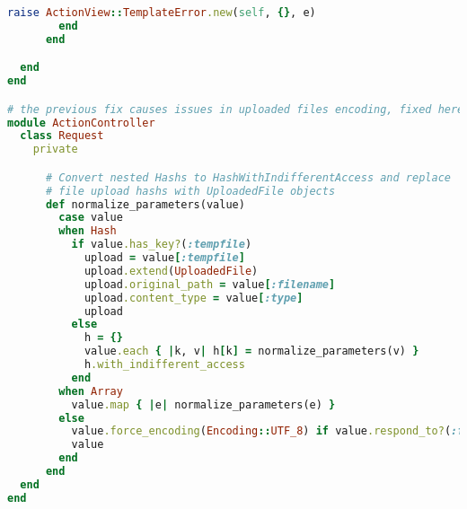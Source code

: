 \begin{lstlisting}[language=ruby]
          raise ActionView::TemplateError.new(self, {}, e)
        end
      end

  end
end

# the previous fix causes issues in uploaded files encoding, fixed here
module ActionController
  class Request
    private

      # Convert nested Hashs to HashWithIndifferentAccess and replace
      # file upload hashs with UploadedFile objects
      def normalize_parameters(value)
        case value
        when Hash
          if value.has_key?(:tempfile)
            upload = value[:tempfile]
            upload.extend(UploadedFile)
            upload.original_path = value[:filename]
            upload.content_type = value[:type]
            upload
          else
            h = {}
            value.each { |k, v| h[k] = normalize_parameters(v) }
            h.with_indifferent_access
          end
        when Array
          value.map { |e| normalize_parameters(e) }
        else
          value.force_encoding(Encoding::UTF_8) if value.respond_to?(:force_encoding)
          value
        end
      end
  end
end
\end{lstlisting}
